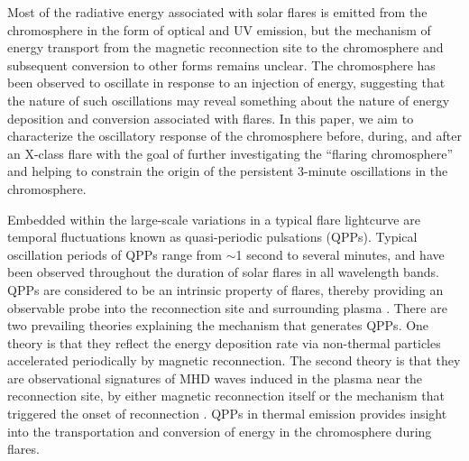 Most of the radiative energy associated with solar flares
is emitted from the chromosphere
in the form of optical and UV emission, but the mechanism of energy
transport from the magnetic reconnection site to the chromosphere
and subsequent conversion to other forms remains unclear.
The chromosphere has been observed
to oscillate in response to an injection of energy,
suggesting that the nature of such oscillations may reveal
something about the nature of energy deposition and conversion
associated with flares.
In this paper, we aim to characterize the oscillatory response of
the chromosphere before, during, and after an X-class flare
with the goal of
further investigating the ``flaring chromosphere'' and
helping to constrain the origin of the persistent 3-minute oscillations
in the chromosphere.

Embedded within the large-scale variations
in a typical flare lightcurve
are temporal fluctuations known as quasi-periodic pulsations (QPPs).
Typical oscillation periods of QPPs
range from $\sim$1 second to several minutes,
and have been observed throughout the duration of solar flares
in all wavelength bands.
QPPs are considered to be an intrinsic
property of flares, thereby providing an observable
probe into the reconnection site and surrounding plasma
\citep{Inglis2015}.
There are two prevailing theories explaining the mechanism
that generates QPPs.
One theory is that they reflect the energy deposition rate
via non-thermal particles accelerated periodically by
magnetic reconnection.
The second theory is that they are observational signatures of MHD waves
induced in the plasma near the reconnection site,
by either magnetic reconnection itself or the mechanism that triggered
the onset of reconnection
\citep{Nakariakov2009}.
QPPs in thermal emission provides insight into
the transportation and conversion of energy in the
chromosphere during flares.


